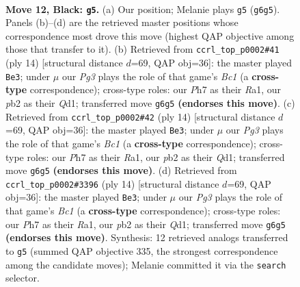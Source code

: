 \documentclass[11pt]{article}
\begin{document}
\clearpage

\begin{figure}[p]\centering
\begin{subfigure}{0.46\textwidth}\centering
\resizebox{\linewidth}{!}{%
\newchessgame
\chessboard[
  setfen={r1bqr1k1/1pp1bp1p/2n1p1p1/p2n4/2NP3P/4PBP1/PP3P2/RNBQR1K1 b - - 0 12},
  showmover=false,
  pgfstyle=straightmove, color=movearrow, markmove={g6-g5}
]}
\caption{}
\end{subfigure}\hfill
\begin{subfigure}{0.46\textwidth}\centering
\resizebox{\linewidth}{!}{%
\newchessgame
\chessboard[
  setfen={r1bqkb1r/1p3ppp/p1nppn2/8/3NP3/1BN5/PPP2PPP/R1BQK2R w KQkq - 4 8},
  showmover=false,
  pgfstyle=straightmove, color=movearrow, markmove={c1-e3}
]}
\caption{}
\end{subfigure}
\\[4pt]
\begin{subfigure}{0.46\textwidth}\centering
\resizebox{\linewidth}{!}{%
\newchessgame
\chessboard[
  setfen={r1bqkb1r/1p3ppp/p1nppn2/8/3NP3/1BN5/PPP2PPP/R1BQK2R w KQkq - 4 8},
  showmover=false,
  pgfstyle=straightmove, color=movearrow, markmove={c1-e3}
]}
\caption{}
\end{subfigure}\hfill
\begin{subfigure}{0.46\textwidth}\centering
\resizebox{\linewidth}{!}{%
\newchessgame
\chessboard[
  setfen={r1bqkb1r/1p3ppp/p1nppn2/8/3NP3/1BN5/PPP2PPP/R1BQK2R w KQkq - 2 8},
  showmover=false,
  pgfstyle=straightmove, color=movearrow, markmove={c1-e3}
]}
\caption{}
\end{subfigure}
\caption{\textbf{Move 12, Black: \texttt{g5}.} (a) Our position; Melanie plays \texttt{g5} (\texttt{g6g5}). Panels (b)--(d) are the retrieved master positions whose correspondence most drove this move (highest QAP objective among those that transfer to it). (b) Retrieved from \texttt{ccrl\_top\_p0002\#41} (ply 14) [structural distance $d$=69, QAP obj=36]: the master played \texttt{Be3}; under $\mu$ our \emph{Pg3} plays the role of that game's \emph{Bc1} (a \textbf{cross-type} correspondence); cross-type roles: our \emph{P}h7 as their \emph{R}a1, our \emph{p}b2 as their \emph{Q}d1; transferred move \texttt{g6g5} \textbf{(endorses this move)}. (c) Retrieved from \texttt{ccrl\_top\_p0002\#42} (ply 14) [structural distance $d$=69, QAP obj=36]: the master played \texttt{Be3}; under $\mu$ our \emph{Pg3} plays the role of that game's \emph{Bc1} (a \textbf{cross-type} correspondence); cross-type roles: our \emph{P}h7 as their \emph{R}a1, our \emph{p}b2 as their \emph{Q}d1; transferred move \texttt{g6g5} \textbf{(endorses this move)}. (d) Retrieved from \texttt{ccrl\_top\_p0002\#3396} (ply 14) [structural distance $d$=69, QAP obj=36]: the master played \texttt{Be3}; under $\mu$ our \emph{Pg3} plays the role of that game's \emph{Bc1} (a \textbf{cross-type} correspondence); cross-type roles: our \emph{P}h7 as their \emph{R}a1, our \emph{p}b2 as their \emph{Q}d1; transferred move \texttt{g6g5} \textbf{(endorses this move)}. Synthesis: 12 retrieved analogs transferred to \texttt{g5} (summed QAP objective 335, the strongest correspondence among the candidate moves); Melanie committed it via the \texttt{search} selector.}
\label{fig:thought-m23}
\end{figure}
\end{document}
